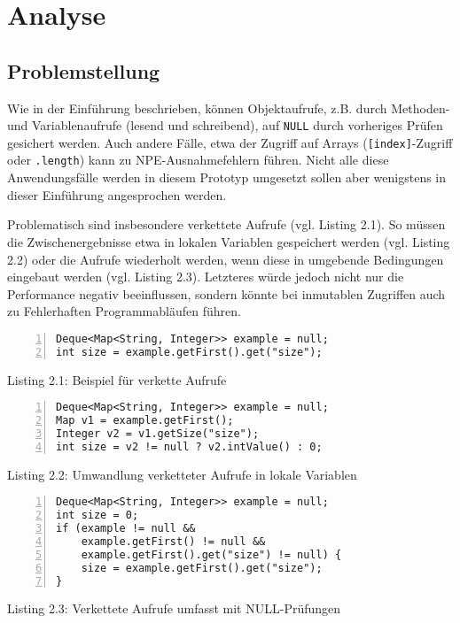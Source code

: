 
\chapter{Analyse}

\section{Problemstellung}

Wie in der Einführung beschrieben, können Objektaufrufe, z.B. durch
Methoden- und Variablenaufrufe (lesend und schreibend), auf \texttt{NULL}
durch vorheriges Prüfen gesichert werden.
Auch andere Fälle, etwa der Zugriff auf Arrays (\texttt{[index]}-Zugriff oder \texttt{.length}) kann
zu NPE-Ausnahmefehlern führen. Nicht alle diese Anwendungsfälle werden
in diesem Prototyp umgesetzt sollen aber wenigstens in dieser Einführung angesprochen werden.

Problematisch sind insbesondere verkettete Aufrufe (vgl. Listing 2.1).
So müssen die Zwischenergebnisse etwa in lokalen Variablen gespeichert werden (vgl. Listing 2.2)
oder die Aufrufe wiederholt werden, wenn diese in umgebende Bedingungen eingebaut werden (vgl. Listing 2.3).
Letzteres würde jedoch nicht nur die Performance negativ beeinflussen, sondern
könnte bei inmutablen Zugriffen auch zu Fehlerhaften Programmabläufen führen.

\begin{lstlisting}[basicstyle=\ttfamily,numbers=left,numberstyle=\footnotesize\ttfamily,backgroundcolor=\color{source}]
Deque<Map<String, Integer>> example = null;
int size = example.getFirst().get("size");
\end{lstlisting}
\centerline{Listing 2.1: Beispiel für verkette Aufrufe}

\vspace{0.3cm}

\begin{lstlisting}[basicstyle=\ttfamily,numbers=left,numberstyle=\footnotesize\ttfamily,backgroundcolor=\color{source}]
Deque<Map<String, Integer>> example = null;
Map v1 = example.getFirst();
Integer v2 = v1.getSize("size");
int size = v2 != null ? v2.intValue() : 0;
\end{lstlisting}
\centerline{Listing 2.2: Umwandlung verketteter Aufrufe in lokale Variablen}

\vspace{0.3cm}

\begin{lstlisting}[basicstyle=\ttfamily,numbers=left,numberstyle=\footnotesize\ttfamily,backgroundcolor=\color{source}]
Deque<Map<String, Integer>> example = null;
int size = 0;
if (example != null &&
	example.getFirst() != null &&
	example.getFirst().get("size") != null) {
	size = example.getFirst().get("size");
}
\end{lstlisting}
\centerline{Listing 2.3: Verkettete Aufrufe umfasst mit NULL-Prüfungen}

